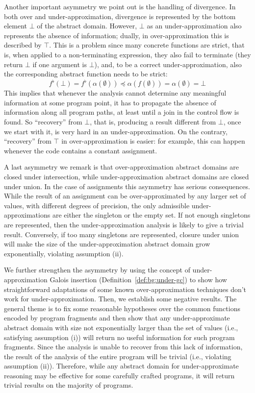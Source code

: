 Another important asymmetry we point out is the handling of divergence.
In both over and under-approximation, divergence is represented by the bottom element $\bot$ of the abstract domain. However, $\bot$ as an under-approximation also represents the absence of information; dually, in over-approximation this is described by $\top$. This is a problem since many concrete functions are strict, that is, when applied to a non-terminating expression, they also fail to terminate (they return $\bot$ if one argument is $\bot$), and, to be a correct under-approximation, also the corresponding abstract function needs to be strict:
\[
f^{\flat}(\bot) = f^{\flat}(\alpha(\emptyset)) \preceq \alpha(f(\emptyset)) = \alpha(\emptyset) = \bot
\]
This implies that whenever the analysis cannot determine any meaningful information at some program point, it has to propagate the absence of information along all program paths, at least until a join in the control flow is found.
So ``recovery'' from $\bot$, that is, producing a result different from $\bot$, once we start with it, is very hard in an under-approximation. On the contrary, ``recovery'' from $\top$ in over-approximation is easier: for example, this can happen whenever the code contains a constant assignment.

A last asymmetry we remark is that over-approximation abstract domains are closed under intersection, while under\hyp{}approximation abstract domains are closed under union. In the case of assignments this asymmetry has serious consequences. While the result of an assignment can be over-approximated by any larger set of values, with different degrees of precision, the only admissible under-approximations are either the singleton or the empty set. If not enough singletons are represented, then the under-approximation analysis is likely to give a trivial result. Conversely, if too many singletons are represented, closure under union will make the size of the under-approximation abstract domain grow exponentially, violating assumption (ii).

We further strengthen the asymmetry by using the concept of under-approximation Galois insertion (Definition~\ref{def:bg:under-gc}) to show how straightforward adaptations of some known over-approximation techniques don't work for under-approximation.
Then, we establish some negative results. The general theme is to fix some reasonable hypotheses over the common functions encoded by program fragments and then show that any under-approximate abstract domain with size not exponentially larger than the set of values (i.e., satisfying assumption (i)) will return no useful information for such program fragments.
Since the analysis is unable to recover from this lack of information, the result of the analysis of the entire program will be trivial (i.e., violating assumption (ii)).
Therefore, while any abstract domain for under-approximate reasoning may be effective for some carefully crafted programs, it will return trivial results on the majority of programs.

